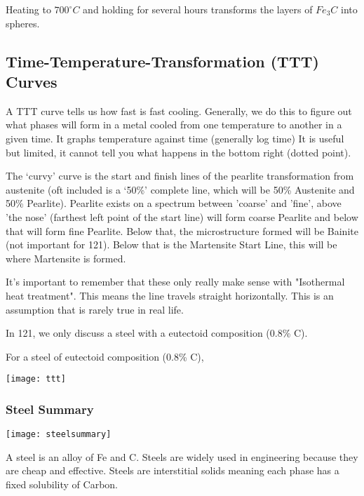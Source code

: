 \documentclass[12pt]{article}
\begin{document}
\begin{center}
Heating to $700^\circ C$ and holding for several hours transforms the layers of $Fe_3C$ into spheres.
\end{center}


\subsection{Time-Temperature-Transformation (TTT) Curves }
A TTT curve tells us how fast is fast cooling. 
Generally, we do this to figure out what phases will form in a metal cooled from one temperature to another in a given time. 
It graphs temperature against time (generally log time)
It is useful but limited, it cannot tell you what happens in the bottom right (dotted point).  

The `curvy' curve is the start and finish lines of the pearlite transformation from austenite (oft included is a `50\%' complete line, which will be 50\% Austenite and 50\% Pearlite).
Pearlite exists on a spectrum between 'coarse' and 'fine', above 'the nose' (farthest left point of the start line) will form coarse Pearlite and below that will form fine Pearlite. 
Below that, the microstructure formed will be Bainite (not important for 121).
Below that is the Martensite Start Line, this will be where Martensite is formed.

It's important to remember that these only really make sense with "Isothermal heat treatment". 
This means the line travels straight horizontally. 
This is an assumption that is rarely true in real life.

\begin{theorem*}
In 121, we only discuss a steel with a eutectoid composition (0.8\% C).
\end{theorem*}

For a steel of eutectoid composition (0.8\% C),
\begin{center}
\texttt{[image: ttt]}
\end{center}

\subsubsection{Steel Summary}
\texttt{[image: steelsummary]}

A steel is an alloy of Fe and C.
Steels are widely used in engineering because they are cheap and effective. 
Steels are interstitial solids meaning each phase has a fixed solubility of Carbon.
\end{document}
